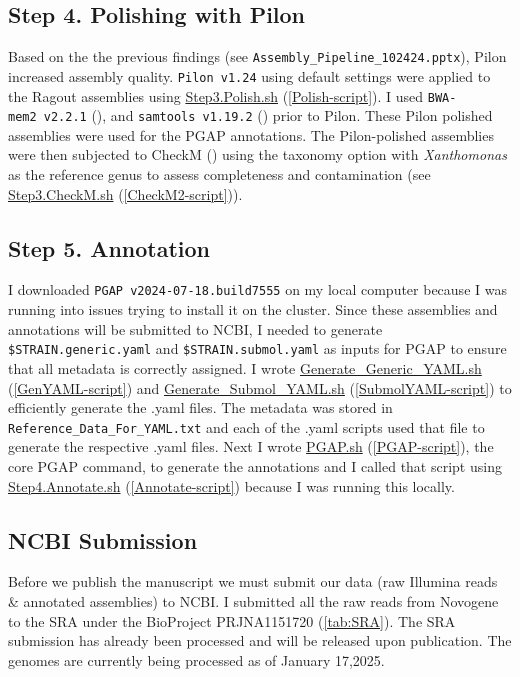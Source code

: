 \documentclass[
]{book}
\begin{document}
\subsection{Step 4. Polishing with Pilon}\label{step-4.-polishing-with-pilon}

Based on the the previous findings (see \texttt{Assembly\_Pipeline\_102424.pptx}), Pilon increased assembly quality. \texttt{Pilon\ v1.24} using default settings were applied to the Ragout assemblies using \hyperref[Polish-script]{Step3.Polish.sh} (\ref{Polish-script}). I used \texttt{BWA-mem2\ v2.2.1} (\citet{Vasimuddin2019}), and \texttt{samtools\ v1.19.2} (\citet{Li2009}) prior to Pilon. These Pilon polished assemblies were used for the PGAP annotations. The Pilon-polished assemblies were then subjected to CheckM (\citet{Parks2015}) using the taxonomy option with \emph{Xanthomonas} as the reference genus to assess completeness and contamination (see \hyperref[CheckM2-script]{Step3.CheckM.sh} (\ref{CheckM2-script})).

\subsection{Step 5. Annotation}\label{step-5.-annotation}

I downloaded \texttt{PGAP\ v2024-07-18.build7555} on my local computer because I was running into issues trying to install it on the cluster. Since these assemblies and annotations will be submitted to NCBI, I needed to generate \texttt{\$STRAIN.generic.yaml} and \texttt{\$STRAIN.submol.yaml} as inputs for PGAP to ensure that all metadata is correctly assigned. I wrote \hyperref[GenYAML-script]{Generate\_Generic\_YAML.sh} (\ref{GenYAML-script}) and \hyperref[SubmolYAML-script]{Generate\_Submol\_YAML.sh} (\ref{SubmolYAML-script}) to efficiently generate the .yaml files. The metadata was stored in \texttt{Reference\_Data\_For\_YAML.txt} and each of the .yaml scripts used that file to generate the respective .yaml files. Next I wrote \hyperref[PGAP-script]{PGAP.sh} (\ref{PGAP-script}), the core PGAP command, to generate the annotations and I called that script using \hyperref[Annotate-script]{Step4.Annotate.sh} (\ref{Annotate-script}) because I was running this locally.

\subsection{NCBI Submission}\label{ncbi-submission}

Before we publish the manuscript we must submit our data (raw Illumina reads \& annotated assemblies) to NCBI. I submitted all the raw reads from Novogene to the SRA under the BioProject PRJNA1151720 (\ref{tab:SRA}). The SRA submission has already been processed and will be released upon publication. The genomes are currently being processed as of January 17,2025.
\end{document}
